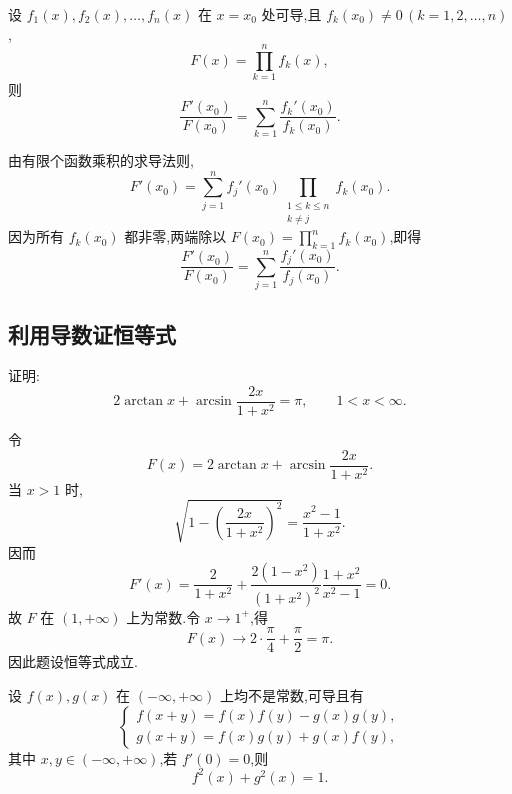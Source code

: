 \begin{example}
    设 $f_1(x),f_2(x),\ldots,f_n(x)$ 在 $x=x_0$ 处可导,且 $f_k(x_0)\neq0\,(k=1,2,\ldots,n)$,
    \[
        F(x)=\prod\limits_{k=1}^n f_k(x),
    \]
    则
    \[
        \dfrac{F'(x_0)}{F(x_0)}
        =\sum\limits_{k=1}^n\dfrac{f_k'(x_0)}{f_k(x_0)}.
    \]
\end{example}
\exampleblank

\begin{solution}
    由有限个函数乘积的求导法则,
    \[
        F'(x_0)=\sum\limits_{j=1}^{n}f_j'(x_0)
        \prod\limits_{\substack{1\leq k\leq n\\k\neq j}}f_k(x_0).
    \]
    因为所有 $f_k(x_0)$ 都非零,两端除以
    $F(x_0)=\displaystyle\prod\limits_{k=1}^{n}f_k(x_0)$,即得
    \[
        \dfrac{F'(x_0)}{F(x_0)}
        =\sum\limits_{j=1}^{n}\dfrac{f_j'(x_0)}{f_j(x_0)}.
    \]
\end{solution}



\subsection{利用导数证恒等式}

\begin{example}
    证明:
    \[
        2\arctan x+\arcsin\dfrac{2x}{1+x^2}=\pi,
        \qquad 1<x<\infty.
    \]
\end{example}
\exampleblank

\begin{solution}
    令
    \[
        F(x)=2\arctan x+\arcsin\dfrac{2x}{1+x^2}.
    \]
    当 $x>1$ 时,
    \[
        \sqrt{1-\left(\dfrac{2x}{1+x^2}\right)^2}
        =\dfrac{x^2-1}{1+x^2}.
    \]
    因而
    \[
        F'(x)=\dfrac{2}{1+x^2}
        +\dfrac{2(1-x^2)}{(1+x^2)^2}
        \dfrac{1+x^2}{x^2-1}=0.
    \]
    故 $F$ 在 $(1,+\infty)$ 上为常数.令 $x\to1^+$,得
    \[
        F(x)\longrightarrow2\cdot\dfrac{\pi}{4}+\dfrac{\pi}{2}=\pi.
    \]
    因此题设恒等式成立.
\end{solution}

\begin{example}
    设 $f(x),g(x)$ 在 $(-\infty,+\infty)$ 上均不是常数,可导且有
    \[
        \begin{cases}
            f(x+y)=f(x)f(y)-g(x)g(y), \\
            g(x+y)=f(x)g(y)+g(x)f(y),
        \end{cases}
    \]
    其中 $x,y\in(-\infty,+\infty)$,若 $f'(0)=0$,则
    \[
        f^2(x)+g^2(x)=1.
    \]
\end{example}
\exampleblank


